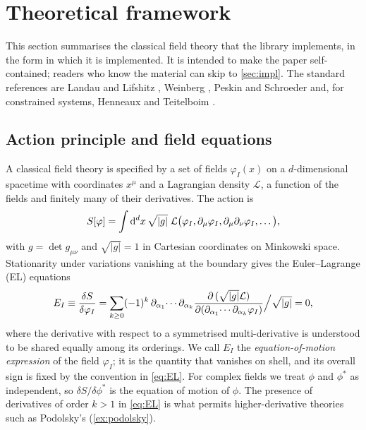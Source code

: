 \section{Theoretical framework}
\label{sec:framework}

This section summarises the classical field theory that the library implements, in the form in which it is implemented. It is intended to make the paper self-contained; readers who know the material can skip to \cref{sec:impl}. The standard references are Landau and Lifshitz \cite{LandauLifshitz}, Weinberg \cite{WeinbergQFT1,WeinbergQFT2}, Peskin and Schroeder \cite{PeskinSchroeder} and, for constrained systems, Henneaux and Teitelboim \cite{HenneauxTeitelboim}.

\subsection{Action principle and field equations}
\label{sec:fw-el}

A classical field theory is specified by a set of fields $\varphi_I(x)$ on a $d$-dimensional spacetime with coordinates $x^\mu$ and a Lagrangian density $\mathcal L$, a function of the fields and finitely many of their derivatives. The action is
\begin{equation}
S[\varphi]=\int\mathrm{d}^dx\,\sqrt{|g|}\;\mathcal L\big(\varphi_I,\partial_\mu\varphi_I,\partial_\mu\partial_\nu\varphi_I,\dots\big),
\label{eq:action}
\end{equation}
with $g=\det g_{\mu\nu}$ and $\sqrt{|g|}=1$ in Cartesian coordinates on Minkowski space. Stationarity under variations vanishing at the boundary gives the Euler--Lagrange (EL) equations
\begin{equation}
E_I\equiv\frac{\delta S}{\delta \varphi_I}=\sum_{k\ge0}(-1)^k\,\partial_{\alpha_1}\!\cdots\partial_{\alpha_k}\frac{\partial\,(\sqrt{|g|}\mathcal L)}{\partial(\partial_{\alpha_1}\!\cdots\partial_{\alpha_k}\varphi_I)}\Big/\sqrt{|g|}=0,
\label{eq:EL}
\end{equation}
where the derivative with respect to a symmetrised multi-derivative is understood to be shared equally among its orderings. We call $E_I$ the \emph{equation-of-motion expression} of the field $\varphi_I$; it is the quantity that vanishes on shell, and its overall sign is fixed by the convention in \cref{eq:EL}. For complex fields we treat $\phi$ and $\phi^*$ as independent, so $\delta S/\delta\phi^*$ is the equation of motion of $\phi$. The presence of derivatives of order $k>1$ in \cref{eq:EL} is what permits higher-derivative theories such as Podolsky's (\cref{ex:podolsky}).

